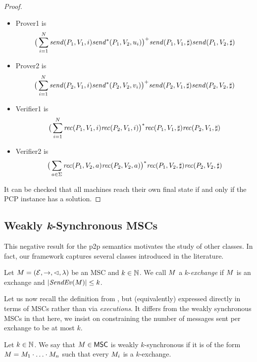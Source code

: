 \documentclass{article}
\begin{document}
\begin{proof}
	\begin{itemize}
	\item Prover1 is $$\big(\sum_{i=1}^N\mathit{send}(P_1, V_1, i)\mathit{send}^*(P_1,V_2,u_i)\big)^+\mathit{send}(P_1, V_1, \sharp)\mathit{send}(P_1, V_2, \sharp)$$
	
	\item Prover2 is $$\big(\sum_{i=1}^N\mathit{send}(P_2, V_1, i)\mathit{send}^*(P_2,V_2,v_i)\big)^+\mathit{send}(P_2, V_1, \sharp)\mathit{send}(P_2, V_2, \sharp)$$
	
	\item Verifier1 is $$\big(\sum_{i=1}^N\mathit{rec}(P_1, V_1, i)\mathit{rec}(P_2, V_1, i)\big)^*\mathit{rec}(P_1, V_1, \sharp)\mathit{rec}(P_2, V_1, \sharp)$$
	
	\item Verifier2 is $$\big(\sum_{a\in\Sigma}\mathit{rec}(P_1, V_2, a)\mathit{rec}(P_2, V_2, a)\big)^*\mathit{rec}(P_1, V_2, \sharp)\mathit{rec}(P_2, V_2, \sharp)$$
	
	\end{itemize}
	
	It can be checked that all machines reach their own final
	state if and only if the PCP instance has a solution.
\end{proof}	

\subsection{Weakly \emph{k}-Synchronous MSCs}\label{sec:weakly-k}

This negative result for the p2p semantics motivates the study of other classes.
In fact, our framework captures several classes introduced in the literature.

\begin{definition}[$k$-exchange]\label{def:weak-k-synchr}
Let $M = (\mathcal{E},\to,\lhd,\lambda)$ be an MSC
and $k \in \mathbb{N}$.
We call $M$ a $k$-\emph{exchange} if
$M$ is an exchange and $|\mathit{SendEv}(M)| \le k$.
\end{definition}


Let us now recall the definition
from \cite{DBLP:conf/cav/BouajjaniEJQ18,DBLP:conf/fossacs/GiustoLL20}, but (equivalently)
expressed directly in terms of MSCs rather than via \emph{executions}. It differs from the weakly synchronous MSCs in that here, we insist on constraining the number of messages sent per exchange to be at most $k$.

\begin{definition}\label{def:weaksync}
Let $k \in \mathbb{N}$.
We say that $M \in \mathsf{MSC}$ is
weakly $k$-synchronous if it is of the form
$M = M_1 \cdot \ldots \cdot M_n$
such that every $M_i$ is a $k$-exchange.
\end{definition}
\end{document}
